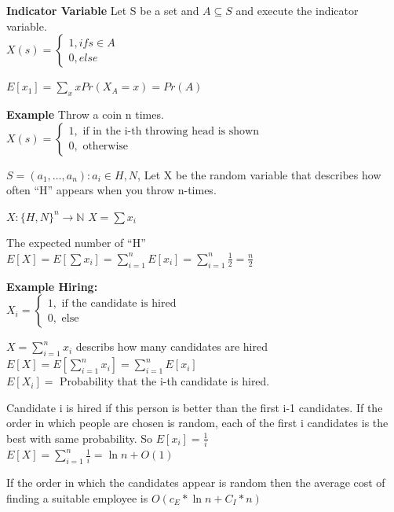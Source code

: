 \textbf{Indicator Variable}
Let S be a set and $A \subseteq S$ and execute the indicator variable.\\

$ X(s)=\left\{\begin{array}{cl} 1, if s\in A \\ 0, else \end{array}\right .$

$E[x{_1}] = \sum\limits_{x} x Pr(X{_A}=x) = Pr(A)$

\textbf{Example}
Throw a coin n times.
$ X(s)=\left\{\begin{array}{cl} 1, \mbox{ if in the i-th throwing head is shown} \\ 0, \mbox{  otherwise } \end{array}\right .$

$S = {(a{_1},\ldots,a{_n}) : a{_i} \in {H,N}}$,
Let X be the random variable that describes how often ``H'' appears when you throw n-times.

$X:\{H,N\}^n \rightarrow \mathbb{N}$
$X=\sum x{_i}$

The expected number of ``H''\\

$E[X] = E[\sum x{_i}] = \sum\limits_{i=1}^n E[x{_i}] = \sum\limits_{i=1}^n \frac{1}{2} = \frac{n}{2}$

\textbf{Example Hiring:}\\

$ X{_i} = \left\{\begin{array}{cl} 1, \mbox{ if the candidate is hired} \\ 0, \mbox{  else } \end{array}\right .$

$X= \sum\limits_{i=1}^n x{_i}$ describs how many candidates are hired\\

$E[X] =  E[\sum\limits_{i=1}^n x{_i}] = \sum\limits_{i=1}^n E[x{_i}]$\\

$E[X{_i}] = $ Probability that the i-th candidate is hired.


Candidate i is hired if this person is better than the first i-1 candidates. If the order in which people are chosen is random, each of the first i candidates is the best with same probability.
So $E[x{_i}] =\frac{1}{i}$\\
$E[X] =  \sum\limits_{i=1}^n \frac{1}{i} = \ln n + O(1)$ 


\begin{lemma}
If the order in which the candidates appear is random then the average cost of finding a suitable employee is
$ O( c_E *  \ln n + C_I * n)$
\end{lemma}

